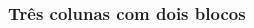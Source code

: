 \documentclass[aspectratio=169]{beamer}
\begin{document}

\begin{frame}[fragile] \frametitle{Três colunas com dois blocos}
\vspace{-1em}
\begin{columns}[t]
\begin{column}{0.32\linewidth}
  \begin{exampleblock}{} \centering
  \end{exampleblock}
  \vspace{0.5em}
  \begin{block}{\lipsum[2][5]}
    \lipsum[2][6]
  \end{block}
\end{column}
\begin{column}{0.32\linewidth}
  \begin{exampleblock}{} \centering

\end{exampleblock}
\end{column}
\end{columns}
\end{frame}
\end{document}
